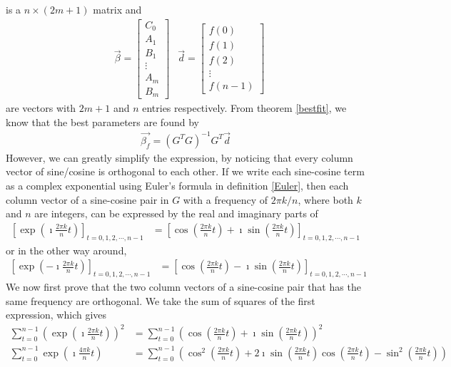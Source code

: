 is a $n \times (2m+1)$ matrix and
\begin{align*}
&\vec{\beta} = 
\begin{bmatrix}
C_0 \\
A_1 \\
B_1 \\
\vdots \\
A_m \\
B_m
\end{bmatrix}
&\vec{d} = 
\begin{bmatrix}
f(0) \\
f(1) \\
f(2) \\
\vdots \\
f(n-1)
\end{bmatrix}
\end{align*}
are vectors with $2m+1$ and $n$ entries respectively. From theorem \ref{bestfit}, we know that the best parameters are found by
\begin{align*}
\vec{\beta_f} = (G^TG)^{-1}G^T\vec{d}
\end{align*}
However, we can greatly simplify the expression, by noticing that every column vector of sine/cosine is orthogonal to each other. If we write each sine-cosine term as a complex exponential using Euler's formula in definition \ref{Euler}, then each column vector of a sine-cosine pair in $G$ with a frequency of $2\pi k/n$, where both $k$ and $n$ are integers, can be expressed by the real and imaginary parts of
\begin{align*}
\left[\exp(\imath \frac{2\pi k}{n} t)\right]_{t = 0,1,2,\cdots,n-1}
&= \left[\cos(\frac{2\pi k}{n} t) + \imath\sin(\frac{2\pi k}{n} t) \right]_{t = 0,1,2,\cdots,n-1}
\end{align*}
or in the other way around,
\begin{align*}
\left[\exp(-\imath \frac{2\pi k}{n} t)\right]_{t = 0,1,2,\cdots,n-1}
&= \left[\cos(\frac{2\pi k}{n} t) - \imath\sin(\frac{2\pi k}{n} t) \right]_{t = 0,1,2,\cdots,n-1}
\end{align*}
We now first prove that the two column vectors of a sine-cosine pair that has the same frequency are orthogonal. We take the sum of squares of the first expression, which gives
\begin{align*}
\sum_{t=0}^{n-1} (\exp(\imath \frac{2\pi k}{n} t))^2 &= \sum_{t=0}^{n-1} (\cos(\frac{2\pi k}{n} t) + \imath\sin(\frac{2\pi k}{n} t))^2 \\
\sum_{t=0}^{n-1} \exp(\imath \frac{4\pi k}{n} t) &= \sum_{t=0}^{n-1} (\cos^2(\frac{2\pi k}{n} t) + 2\imath\sin(\frac{2\pi k}{n} t)\cos(\frac{2\pi k}{n} t) - \sin^2(\frac{2\pi k}{n} t))
\end{align*}

